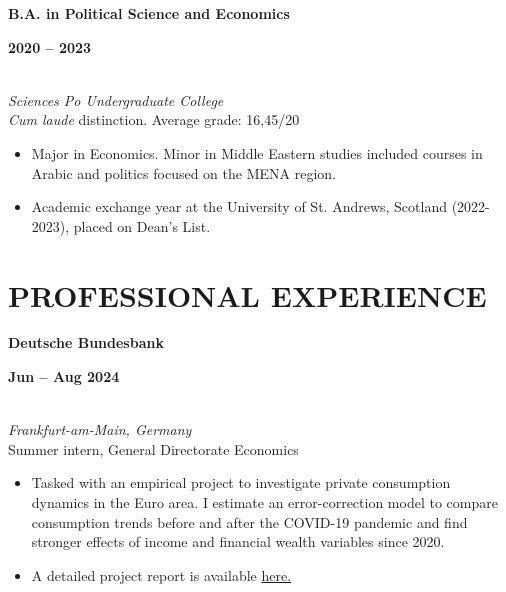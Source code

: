 \documentclass[a4paper,9pt]{extarticle}
\begin{document}
\noindent
\begin{minipage}[t]{0.7\textwidth}
  \textbf{B.A. in Political Science and Economics}
\end{minipage}%
\begin{minipage}[t]{0.3\textwidth}
  \raggedleft \textbf{2020 -- 2023}
\end{minipage}
\\
\textit{Sciences Po Undergraduate College} \\
\textit{Cum laude} distinction. Average grade: 16,45/20
\begin{itemize}[noitemsep, topsep=0pt, left=0.65cm]
    \item Major in Economics. Minor in Middle Eastern studies included courses in Arabic and politics focused on the MENA region. 
    \item Academic exchange year at the University of St. Andrews, Scotland (2022-2023), placed on Dean's List. \\
\end{itemize} 


\section*{PROFESSIONAL EXPERIENCE}

\noindent
\newline
\begin{minipage}[t]{0.7\textwidth}
  \textbf{Deutsche Bundesbank}
\end{minipage}%
\begin{minipage}[t]{0.3\textwidth}
  \raggedleft \textbf{Jun -- Aug 2024}
\end{minipage}
\\
\textit{Frankfurt-am-Main, Germany} \\ 
Summer intern, General Directorate Economics 
\begin{itemize}[noitemsep, topsep=0pt, left=0.65cm]
    \item  Tasked with an empirical project to investigate private consumption dynamics in the Euro area. I estimate an error-correction model to compare consumption trends before and after the COVID-19 pandemic and find stronger effects of income and financial wealth variables since 2020.
    \item A detailed project report is available \href{https://lionelchambon.github.io/files/Chambon_BundesbankProject_EN.pdf}{here.}
    \\
\end{itemize}
\end{document}
